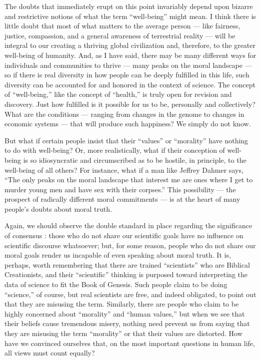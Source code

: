\documentclass[a4paper,14pt]{extarticle}
\begin{document}
The doubts that immediately erupt on this point invariably depend upon bizarre and restrictive notions of what the term ``well-being'' might mean.
I think there is little doubt that most of what matters to the average person --- like fairness, justice, compassion, and a general awareness of terrestrial reality --- will be integral to our creating a thriving global civilization and, therefore, to the greater well-being of humanity.
And, as I have said, there may be many different ways for individuals and communities to thrive --- many peaks on the moral landscape --- so if there is real diversity in how people can be deeply fulfilled in this life, such diversity can be accounted for and honored in the context of science.
The concept of ``well-being,'' like the concept of ``health,'' is truly open for revision and discovery.
Just how fulfilled is it possible for us to be, personally and collectively?
What are the conditions --- ranging from changes in the genome to changes in economic systems --- that will produce such happiness?
We simply do not know.

But what if certain people insist that their ``values'' or ``morality'' have nothing to do with well-being?
Or, more realistically, what if their conception of well-being is so idiosyncratic and circumscribed as to be hostile, in principle, to the well-being of all others?
For instance, what if a man like Jeffrey Dahmer says, ``The only peaks on the moral landscape that interest me are ones where I get to murder young men and have sex with their corpses.''
This possibility --- the prospect of radically different moral commitments --- is at the heart of many people's doubts about moral truth.

Again, we should observe the double standard in place regarding the significance of consensus :
those who do not share our scientific goals have no influence on scientific discourse whatsoever;
but, for some reason, people who do not share our moral goals render us incapable of even speaking about moral truth.
It is, perhaps, worth remembering that there are trained ``scientists'' who are Biblical Creationists, and their ``scientific'' thinking is purposed toward interpreting the data of science to fit the Book of Genesis.
Such people claim to be doing ``science,'' of course, but real scientists are free, and indeed obligated, to point out that they are misusing the term.
Similarly, there are people who claim to be highly concerned about ``morality'' and ``human values,'' but when we see that their beliefs cause tremendous misery, nothing need prevent us from saying that they are misusing the term ``morality'' or that their values are distorted.
How have we convinced ourselves that, on the most important questions in human life, all views must count equally?
\end{document}

